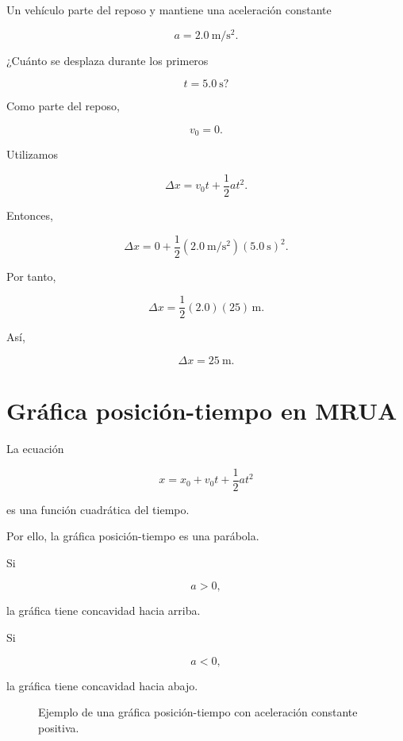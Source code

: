 \begin{ejemplo}

Un vehículo parte del reposo y mantiene una aceleración constante

\[ a=\SI{2.0}{\meter\per\second\squared}. \]

¿Cuánto se desplaza durante los primeros

\[ t=\SI{5.0}{\second}? \]

Como parte del reposo,

\[ v_0=0. \]

Utilizamos

\[ \Delta x=v_0t+\frac{1}{2}at^2. \]

Entonces,

\[
\Delta x
=
0
+
\frac{1}{2}
\left(\SI{2.0}{\meter\per\second\squared}\right)
\left(\SI{5.0}{\second}\right)^2.
\]

Por tanto,

\[
\Delta x
=
\frac{1}{2}(2.0)(25)\,\si{\meter}.
\]

Así,

\[ \boxed{\Delta x=\SI{25}{\meter}}. \]
\end{ejemplo}


\section{Gráfica posición-tiempo en MRUA}

La ecuación

\[ x=x_0+v_0t+\frac{1}{2}at^2 \]

es una función cuadrática del tiempo.

Por ello, la gráfica posición-tiempo es una parábola.

Si

\[ a>0, \]

la gráfica tiene concavidad hacia arriba.

Si

\[ a<0, \]

la gráfica tiene concavidad hacia abajo.

\begin{figure}[H]
    \centering


    \caption{Ejemplo de una gráfica posición-tiempo con aceleración constante
    positiva.}
\end{figure}


